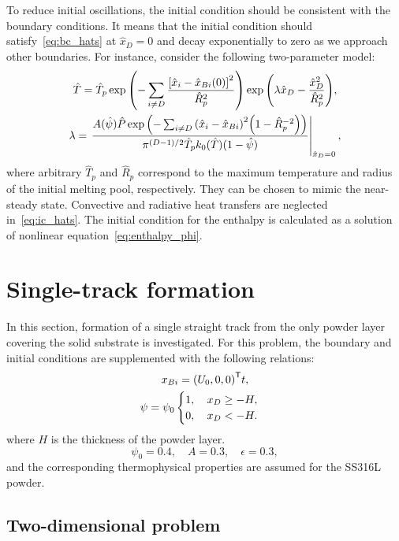 \documentclass{article}
\newcommand{\transpose}[1]{#1^\mathsf{T}}
\newcommand{\Hx}{\hat{x}}
\newcommand{\HT}{\hat{T}}
\newcommand{\HP}{\hat{P}}
\newcommand{\Hpsi}{\hat{\psi}}
\newcommand{\HR}{\hat{R}}
\begin{document}
To reduce initial oscillations, the initial condition should be consistent with the boundary conditions.
It means that the initial condition should satisfy~\eqref{eq:bc_hats} at \(\Hx_D=0\)
and decay exponentially to zero as we approach other boundaries.
For instance, consider the following two-parameter model:
\begin{gather}
    \HT = \HT_p\exp\qty( -\sum_{i\neq D}\frac{\qty[\Hx_i-\Hx_{Bi}(0)]^2}{\HR_p^2} )
        \exp\qty(\lambda \Hx_D - \frac{\Hx_D^2}{\HR_p^2}), \label{eq:ic_hats}\\
    \lambda = \eval{ \frac{A(\Hpsi)\HP\exp\qty( -\sum_{i\neq D}\qty(\Hx_i-\Hx_{Bi})^2\qty(1-\HR_p^{-2}) )}
        {\pi^{(D-1)/2}\HT_p k_0(\HT)(1-\Hpsi)} }_{\Hx_D=0}, \label{eq:lambda}
\end{gather}
where arbitrary \(\HT_p\) and \(\HR_p\) correspond to the maximum temperature
and radius of the initial melting pool, respectively.
They can be chosen to mimic the near-steady state.
Convective and radiative heat transfers are neglected in~\eqref{eq:ic_hats}.
The initial condition for the enthalpy is calculated as a solution of nonlinear equation~\eqref{eq:enthalpy_phi}.

\section{Single-track formation}

In this section, formation of a single straight track from the only powder layer covering the solid substrate is investigated.
For this problem, the boundary and initial conditions are supplemented with the following relations:
\begin{gather}
    x_{Bi} = \transpose{\qty(U_0,0,0)}t, \label{eq:single:bc} \\
    \psi = \psi_0\begin{cases}
        1, \quad x_D \geq -H, \\
        0, \quad x_D < -H.
    \end{cases}\label{eq:single:ic}
\end{gather}
where \(H\) is the thickness of the powder layer.
\begin{equation}\label{eq:single:params}
    \psi_0 = 0.4, \quad A = 0.3, \quad \epsilon = 0.3,
\end{equation}
and the corresponding thermophysical properties are assumed for the SS316L powder.

\subsection{Two-dimensional problem}
\end{document}
